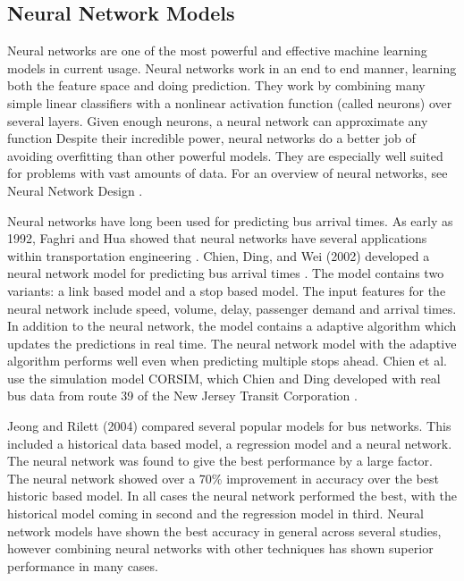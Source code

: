 \subsection{Neural Network Models}

Neural networks are one of the most powerful and effective machine learning models in current usage.
Neural networks work in an end to end manner, learning both the feature space and doing prediction.
They work by combining many simple linear classifiers with a nonlinear activation function (called neurons) over several layers.
Given enough neurons, a neural network can approximate any function \cite{hornik1989multilayer}
Despite their incredible power, neural networks do a better job of avoiding overfitting than other powerful models.
They are especially well suited for problems with vast amounts of data.
For an overview of neural networks, see Neural Network Design \cite{demuth2014neural}.


Neural networks have long been used for predicting bus arrival times.
As early as 1992, Faghri and Hua showed that neural networks have several applications within transportation engineering \cite{faghri1992evaluation}.
Chien, Ding, and Wei (2002) developed a neural network model for predicting bus arrival times \cite{chien2002dynamic}.
The model contains two variants: a link based model and a stop based model.
The input features for the neural network include speed, volume, delay, passenger demand and arrival times.
In addition to the neural network, the model contains a adaptive algorithm which updates the predictions in real time.
The neural network model with the adaptive algorithm performs well even when predicting multiple stops ahead.
Chien et al. use the simulation model CORSIM, which Chien and Ding developed with real bus data from route 39 of the New Jersey Transit Corporation \cite{ding2000simulating}.


Jeong and Rilett (2004) compared several popular models for bus networks\cite{jeong2004bus}.
This included a historical data based model, a regression model and a neural network.
The neural network was found to give the best performance by a large factor.
The neural network showed over a 70\% improvement in accuracy over the best historic based model.
In all cases the neural network performed the best, with the historical model coming in second and the regression model in third.
Neural network models have shown the best accuracy in general across several studies, however combining neural networks with other techniques has shown superior performance in many cases.

